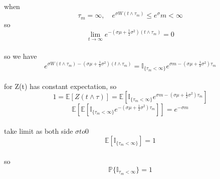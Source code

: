 \documentclass{article}
\begin{document}
\paragraph{}{when \begin{displaymath}
                    \tau_{m}=\infty,\quad e^{\sigma W(t\land\tau_{m})}\le e^\sigma m <\infty
                  \end{displaymath} so \begin{displaymath}
                                         \lim_{t \to \infty} e^{-(\sigma\mu+\frac{1}{2}\sigma^{2})(t\land \tau_{m})}=0
                                       \end{displaymath}}
\paragraph{}{so we have \begin{displaymath}
                          e^{\sigma W(t\land \tau_{m})-(\sigma\mu+\frac{1}{2}\sigma^{2})(t\land \tau_{m})}=\mathbb{I}_{\{\tau_{m}<\infty\}}e^{\sigma m-(\sigma\mu+\frac{1}{2}\sigma^2)\tau_{m}}
                        \end{displaymath}}
\paragraph{}{for Z(t) has constant expectation, so}
\begin{displaymath}
  1=\mathbb{E}[Z(t\land \tau)]=\mathbb{E}[\mathbb{I}_{\{\tau_{m}<\infty\}}e^{\sigma m-(\sigma\mu+\frac{1}{2}\sigma^2)\tau_{m}}]
\end{displaymath}
\begin{displaymath}
  \mathbb{E}[\mathbb{E}[\mathbb{I}_{\{\tau_{m}<\infty\}}e^{-(\sigma\mu+\frac{1}{2}\sigma^2)\tau_{m}}]]=e^{-\sigma m}
\end{displaymath}
\paragraph{}{take limit as both side $\sigma to 0$}
\begin{displaymath}
  \mathbb{E}[\mathbb{I}_{\{\tau_{m}< \infty \}}]=1
\end{displaymath}
\paragraph{}{so \begin{displaymath}
                  \mathbb{P}\{\mathbb{I}_{\tau_{m}<\infty}\}=1
                \end{displaymath}}
\end{document}
